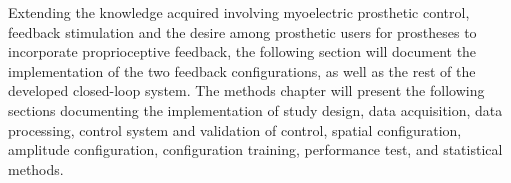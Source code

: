 

Extending the knowledge acquired involving myoelectric prosthetic control, feedback stimulation and the desire among prosthetic users for prostheses to incorporate proprioceptive feedback, the following section will document the implementation of the two feedback configurations, as well as the rest of the developed closed-loop system. The methods chapter will present the following sections documenting the implementation of study design, data acquisition, data processing, control system and validation of control, spatial configuration, amplitude configuration, configuration training, performance test, and statistical methods.      